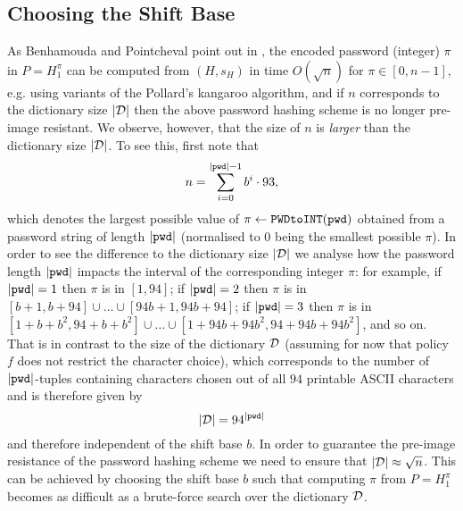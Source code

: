 \subsection{Choosing the Shift Base}\label{rem:basischoice}
As Benhamouda and Pointcheval point out in \cite{BenhamoudaP13}, the encoded password (integer) $\pi$ in $P=H_1^\pi$ can be computed from $(H, s_H)$ in time $O(\sqrt{n})$ for $\pi \in [0,n-1]$, e.g. using variants of the Pollard's kangaroo algorithm, and if $n$ corresponds to the dictionary size $|\mathcal{D}|$ then the above password hashing scheme is no longer pre-image resistant. We observe, however, that
the size of $n$ is \emph{larger} than the dictionary size $|\mathcal{D}|$. To see this, first note that 
\[n=\sum_{i=0}^{|\mathtt{pwd}|-1}b^i\cdot 93,\] 
which denotes the largest possible value of $\pi \gets \texttt{PWDtoINT}(\mathtt{pwd})$ obtained from a password string of length $|\mathtt{pwd}|$ (normalised to $0$ being the smallest possible $\pi$). 
In order to see the difference to the dictionary size $|\mathcal{D}|$ we analyse how the password length $|\mathtt{pwd}|$ impacts the interval of the corresponding integer $\pi$: for example, if $|\mathtt{pwd}| = 1$ then $\pi$ is in $[1,94]$; if $|\mathtt{pwd}|=2$ then $\pi$ is in $[b+1,b+94]\cup \dots \cup[94b+1,94b+94]$; if $|\mathtt{pwd}|=3$ then $\pi$ is in  $[1+b+b^2,94+b+b^2]\cup\dots\cup[1+94b+94b^2,94+94b+94b^2]$, and so on. 
That is in contrast to the size of the dictionary $\mathcal{D}$ (assuming for now that policy $f$ does not restrict the character choice), which corresponds to the number of $|\mathtt{pwd}|$-tuples containing characters chosen out of all $94$ printable \ac{ASCII} characters and is therefore given by 
\[|\mathcal{D}| = 94^{|\mathtt{pwd}|}\]
and therefore independent of the shift base $b$.
In order to guarantee the pre-image resistance of the password hashing scheme we need to ensure that $|\mathcal{D}| \approx \sqrt{n}$.
This can be achieved by choosing the shift base $b$ such that computing $\pi$ from $P=H_1^\pi$ becomes as difficult as a brute-force search over the dictionary $\mathcal{D}$. 
